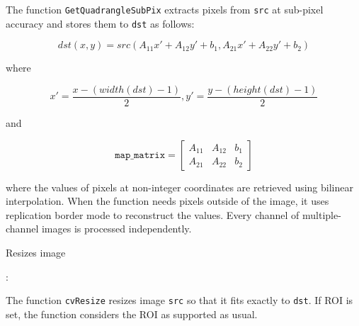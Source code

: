 \begin{description}
\end{description}

The function \texttt{GetQuadrangleSubPix} extracts pixels from \texttt{src} at sub-pixel accuracy and stores them to \texttt{dst} as follows:

\[
dst(x, y)= src( A_{11} x' + A_{12} y' + b_1, A_{21} x' + A_{22} y' + b_2)
\]

where

\[
x'=\frac{x-(width(dst)-1)}{2}, 
y'=\frac{y-(height(dst)-1)}{2}
\]

and

\[
\texttt{map\_matrix} = \begin{bmatrix}
A_{11} & A_{12} & b_1\\
A_{21} & A_{22} & b_2
\end{bmatrix}
\]

where the values of pixels at non-integer coordinates are retrieved using bilinear interpolation. When the function needs pixels outside of the image, it uses replication border mode to reconstruct the values. Every channel of multiple-channel images is processed independently.


\label{Resize}
Resizes image


\begin{description}
:
\begin{description}
\end{description}
\end{description}

The function \texttt{cvResize} resizes image \texttt{src} so that it fits exactly to \texttt{dst}. If ROI is set, the function considers the ROI as supported as usual.

